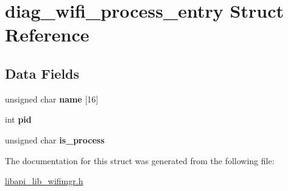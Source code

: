 \hypertarget{structdiag__wifi__process__entry}{}\section{diag\+\_\+wifi\+\_\+process\+\_\+entry Struct Reference}
\label{structdiag__wifi__process__entry}
\subsection*{Data Fields}
\begin{DoxyCompactItemize}
\item 
\mbox{\label{structdiag__wifi__process__entry_a9cb1d9ddab823294bf045b34b3088da7}} 
unsigned char {\bfseries name} \mbox{[}16\mbox{]}
\item 
\mbox{\label{structdiag__wifi__process__entry_aa440ab0e6b1b5ab6433ec3298d09b19f}} 
int {\bfseries pid}
\item 
\mbox{\label{structdiag__wifi__process__entry_a0015ec7142b3f37b04bf8ed281e2bbb1}} 
unsigned char {\bfseries is\+\_\+process}
\end{DoxyCompactItemize}


The documentation for this struct was generated from the following file\+:\begin{DoxyCompactItemize}
\item 
\hyperlink{libapi__lib__wifimgr_8h}{libapi\+\_\+lib\+\_\+wifimgr.\+h}\end{DoxyCompactItemize}
